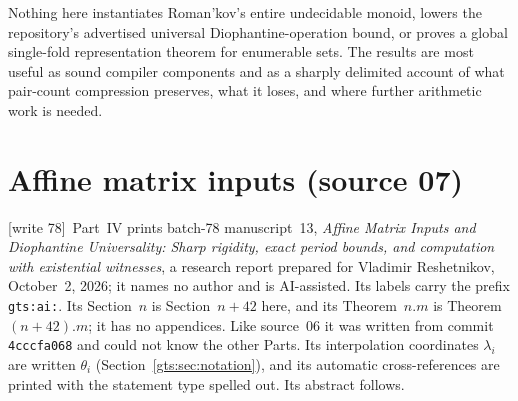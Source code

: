 \documentclass[11pt,letterpaper]{article}
\theoremstyle{definition}
\theoremstyle{remark}
\newcommand{\wtagb}{\textup{[write 78]}}
\begin{document}
Nothing here instantiates Roman'kov's entire undecidable monoid, lowers the repository's advertised universal Diophantine-operation bound, or proves a global single-fold representation theorem for enumerable sets. The results are most useful as sound compiler components and as a sharply delimited account of what pair-count compression preserves, what it loses, and where further arithmetic work is needed.

\part{Affine matrix inputs (source 07)}\label{gts:part:ai}

\noindent\wtagb\ Part~IV prints batch-78 manuscript~13, \emph{Affine Matrix Inputs and Diophantine Universality: Sharp rigidity, exact period bounds, and computation with existential witnesses}, a research report prepared for Vladimir Reshetnikov, October~2, 2026; it names no author and is AI-assisted. Its labels carry the prefix \texttt{gts:ai:}. Its Section~$n$ is Section~$n+42$ here, and its Theorem~$n.m$ is Theorem~$(n+42).m$; it has no appendices. Like source~06 it was written from commit \texttt{4cccfa068} and could not know the other Parts. Its interpolation coordinates $\lambda_i$ are written $\theta_i$ (Section~\ref{gts:sec:notation}), and its automatic cross-references are printed with the statement type spelled out. Its abstract follows.
\end{document}
